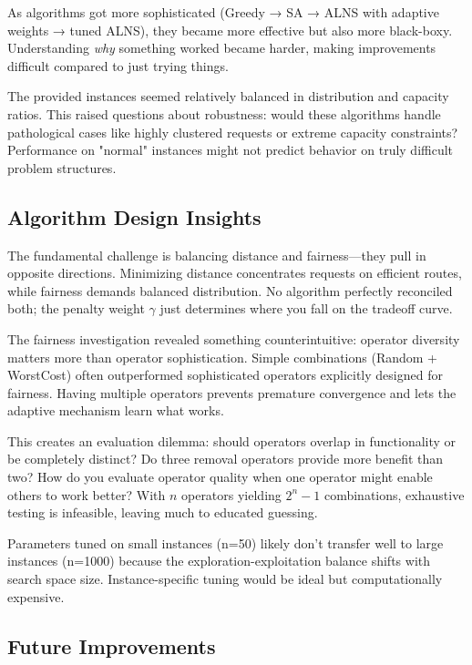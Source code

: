 \documentclass[a4paper]{scrartcl}
\begin{document}
As algorithms got more sophisticated (Greedy → SA → ALNS with adaptive weights → tuned ALNS), they became more effective but also more black-boxy.
Understanding \textit{why} something worked became harder, making improvements difficult compared to just trying things.

The provided instances seemed relatively balanced in distribution and capacity ratios.
This raised questions about robustness: would these algorithms handle pathological cases like highly clustered requests or extreme capacity constraints?
Performance on "normal" instances might not predict behavior on truly difficult problem structures.

\subsection{Algorithm Design Insights}

The fundamental challenge is balancing distance and fairness—they pull in opposite directions.
Minimizing distance concentrates requests on efficient routes, while fairness demands balanced distribution.
No algorithm perfectly reconciled both; the penalty weight $\gamma$ just determines where you fall on the tradeoff curve.

The fairness investigation revealed something counterintuitive: operator diversity matters more than operator sophistication.
Simple combinations (Random + WorstCost) often outperformed sophisticated operators explicitly designed for fairness.
Having multiple operators prevents premature convergence and lets the adaptive mechanism learn what works.

This creates an evaluation dilemma: should operators overlap in functionality or be completely distinct?
Do three removal operators provide more benefit than two?
How do you evaluate operator quality when one operator might enable others to work better?
With $n$ operators yielding $2^n - 1$ combinations, exhaustive testing is infeasible, leaving much to educated guessing.

Parameters tuned on small instances (n=50) likely don't transfer well to large instances (n=1000) because the exploration-exploitation balance shifts with search space size.
Instance-specific tuning would be ideal but computationally expensive.

\subsection{Future Improvements}
\end{document}
